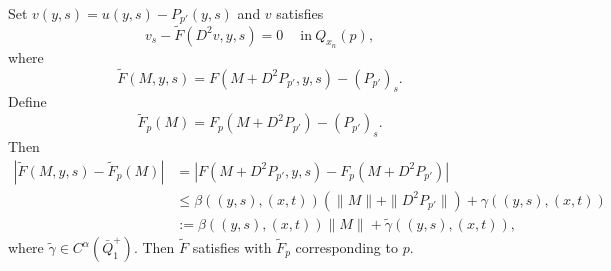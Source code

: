 \documentclass[preprint,12pt]{elsarticle}
\theoremstyle{definition}
\theoremstyle{remark}
\numberwithin{equation}{section}
\begin{document}
Set $v(y,s)=u(y,s)-P_{p'}(y,s)$ and $v$ satisfies
\begin{equation}\label{e.Cka-4}
  v_s-\tilde{F}(D^2v,y,s)=0~~~~\mbox{    in}~Q_{x_n}(p),
\end{equation}
where
\begin{equation*}
\tilde{F}(M,y,s)=F(M+D^2P_{p'},y,s)-(P_{p'})_s.
\end{equation*}
Define
\begin{equation*}
\tilde{F}_{p}(M)=F_{p}(M+D^2P_{p'})-(P_{p'})_s.
\end{equation*}
Then
\begin{equation*}
  \begin{aligned}
\left|\tilde{F}(M,y,s)-\tilde{F}_{p}(M)\right|&=\left|F(M+D^2P_{p'},y,s)
-F_{p}(M+D^2P_{p'})\right|\\
&\leq \beta\left((y,s),(x,t)\right)\left(\|M\|+\|D^2P_{p'}\|\right)+
    \gamma\left((y,s),(x,t)\right)\\
    &:=\beta\left((y,s),(x,t)\right)\|M\|+\tilde{\gamma}\left((y,s),(x,t)\right),
  \end{aligned}
\end{equation*}
where $\tilde{\gamma}\in C^{\alpha}(\bar Q^+_{1})$. Then $\tilde{F}$ satisfies  with $\tilde{F}_p$ corresponding to $p$.
\end{document}
